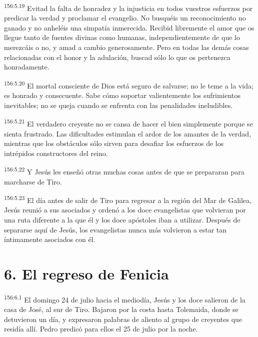 \par 
\textsuperscript{156:5.19} Evitad la falta de honradez y la injusticia en todos vuestros esfuerzos por predicar la verdad y proclamar el evangelio. No busquéis un reconocimiento no ganado y no anheléis una simpatía inmerecida. Recibid libremente el amor que os llegue tanto de fuentes divinas como humanas, independientemente de que lo merezcáis o no, y amad a cambio generosamente. Pero en todas las demás cosas relacionadas con el honor y la adulación, buscad sólo lo que os pertenezca honradamente.

\par 
\textsuperscript{156:5.20} El mortal consciente de Dios está seguro de salvarse; no le teme a la vida; es honrado y consecuente. Sabe cómo soportar valientemente los sufrimientos inevitables; no se queja cuando se enfrenta con las penalidades ineludibles.

\par 
\textsuperscript{156:5.21} El verdadero creyente no se cansa de hacer el bien simplemente porque se sienta frustrado. Las dificultades estimulan el ardor de los amantes de la verdad, mientras que los obstáculos sólo sirven para desafiar los esfuerzos de los intrépidos constructores del reino.

\par 
\textsuperscript{156:5.22} Y Jesús les enseñó otras muchas cosas antes de que se prepararan para marcharse de Tiro.

\par 
\textsuperscript{156:5.23} El día antes de salir de Tiro para regresar a la región del Mar de Galilea, Jesús reunió a sus asociados y ordenó a los doce evangelistas que volvieran por una ruta diferente a la que él y los doce apóstoles iban a utilizar. Después de separarse aquí de Jesús, los evangelistas nunca más volvieron a estar tan íntimamente asociados con él.

\section*{6. El regreso de Fenicia}
\par 
\textsuperscript{156:6.1} El domingo 24 de julio hacia el mediodía, Jesús y los doce salieron de la casa de José, al sur de Tiro. Bajaron por la costa hasta Tolemaida, donde se detuvieron un día, y expresaron palabras de aliento al grupo de creyentes que residía allí. Pedro predicó para ellos el 25 de julio por la noche.

